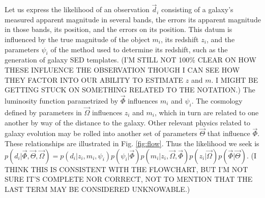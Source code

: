 \documentclass[12pt, onecolumn]{emulateapj}
\begin{document}
Let us express the likelihood of an observation $\vec{d}_{i}$ consisting of a galaxy's measured apparent magnitude in several bands, the errors its apparent magnitude in those bands, its position, and the errors on its position.  This datum is influenced by the true magnitude of the object $m_{i}$, its redshift $z_{i}$, and the parameters $\psi_{i}$ of the method used to determine its redshift, such as the generation of galaxy SED templates.  (I'M STILL NOT 100\% CLEAR ON HOW THESE INFLUENCE THE OBSERVATION THOUGH I CAN SEE HOW THEY FACTOR INTO OUR ABILITY TO ESTIMATE $z$ and $m$.  I MIGHT BE GETTING STUCK ON SOMETHING RELATED TO THE NOTATION.)  The luminosity function parametrized by $\vec{\Phi}$ influences $m_{i}$ and $\psi_{i}$.  The cosmology defined by parameters in $\vec{\Omega}$ influences $z_{i}$ and $m_{i}$, which in turn are related to one another by way of the distance to the galaxy.  Other relevant physics related to galaxy evolution may be rolled into another set of parameters $\vec{\Theta}$ that influence $\vec{\Phi}$.  These relationships are illustrated in Fig. \ref{fig:flow}.  Thus the likelihood we seek is $p(d_{i}|\vec{\Phi},\vec{\Theta},\vec{\Omega})=p(d_{i}|z_{i},m_{i},\psi_{i})p(\psi_{i}|\vec{\Phi})p(m_{i}|z_{i},\vec{\Omega},\vec{\Phi})p(z_{i}|\vec{\Omega})p(\vec{\Phi}|\vec{\Theta})$.  (I THINK THIS IS CONSISTENT WITH THE FLOWCHART, BUT I'M NOT SURE IT'S COMPLETE NOR CORRECT, NOT TO MENTION THAT THE LAST TERM MAY BE CONSIDERED UNKNOWABLE.)
\end{document}
